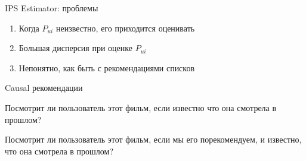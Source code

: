 \documentclass[11pt,aspectratio=169,handout]{beamer}
\begin{document}
\begin{frame}{IPS Estimator: проблемы}

\begin{enumerate}
\item Когда $P_{ui}$ неизвестно, его приходится оценивать
\item Большая дисперсия при оценке $P_{ui}$
\item Непонятно, как быть с рекомендациями списков
\end{enumerate}

\end{frame}

\begin{frame}{Causal рекомендации}

\begin{tcolorbox}[colback=warn!5,colframe=warn!80,title=Традиционный рекомендер]
Посмотрит ли пользователь этот фильм, если известно что она смотрела в прошлом?
\end{tcolorbox}

\begin{tcolorbox}[colback=info!5,colframe=info!80,title=Causal рекомендер]
Посмотрит ли пользователь этот фильм, если мы его порекомендуем, и известно, что она смотрела в прошлом?
\end{tcolorbox}

\end{frame}
\end{document}
